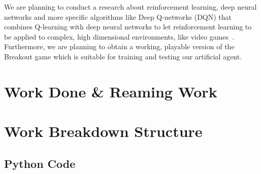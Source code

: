 \documentclass[a4paper, 12pt, conference]{IEEEtran}
\begin{document}
We are planning to conduct a research about reinforcement learning, deep neural networks and more specific algorithms like Deep Q-networks (DQN) that combines Q-learning with deep neural networks to let reinforcement learning to be applied to complex, high dimensional environments, like video games~\autocite{openai}. Furthermore, we are planning to obtain a working, playable version of the Breakout game which is suitable for training and testing our artificial agent.

\section{Work Done \& Reaming Work}


\section{Work Breakdown Structure}

\printbibliography{}

\begin{appendices}
    \onecolumn
    \section{Python Code}
    \inputminted[linenos]{python}{../src/main.py}
\end{appendices}
\end{document}
